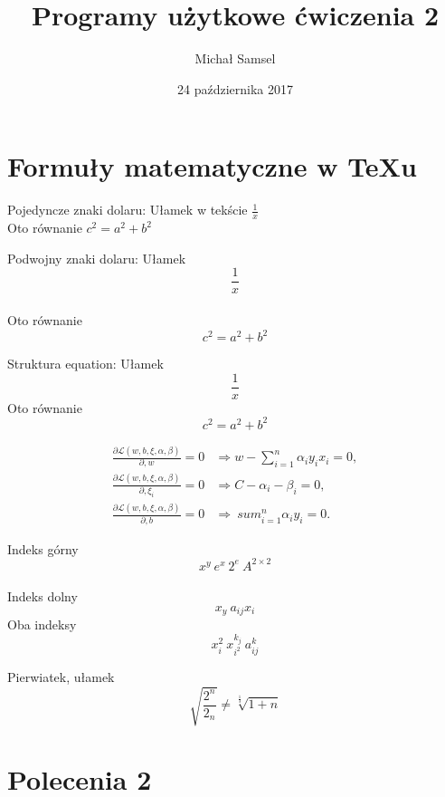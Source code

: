 \documentclass[a4paper,12pt]{article}
\title{Programy użytkowe ćwiczenia 2}
\author{Michał Samsel}
\date{24 października 2017}
\begin{document}
\maketitle

\begin{abstract}

\end{abstract}

\section{Formuły matematyczne w TeXu}
Pojedyncze znaki dolaru:
Ułamek w tekście $ \frac{1}{x} $ \\
Oto równanie $c^{2}=a^{2}+b^{2}$



Podwojny znaki dolaru:
Ułamek $$ \frac{1}{x} $$ \\
Oto równanie $$c^{2}=a^{2}+b^{2}$$



Struktura equation:
Ułamek
\begin{equation}
\frac{1}{x}
\label{eq:rownanie1}
\end{equation}
Oto równanie
\begin{equation}
c^{2}=a^{2}+b^{2}
\label{eq:rownanie2}
\end{equation}



\begin{align}
\label{eq:partialLW}
\frac{\partial \mathcal L (w, b, \xi, \alpha, \beta)}{\partial, w} = 0 & \Rightarrow w 
		- \sum_{i=1}^n\alpha_i y_i x_i=0, \\
\label{eq:PartialLXi}
\frac{\partial \mathcal L (w, b, \xi, \alpha, \beta)}{\partial, \xi_i} =0 & \Rightarrow
		C - \alpha_i-\beta_i=0, \\
\label{eq:partialLB}
\frac{\partial \mathcal L (w, b, \xi, \alpha, \beta)}{\partial, b} = 0 & \Rightarrow \
		sum_{i=1}^n\alpha_i y_i =0.
\end{align}



Indeks górny $$x^{y} \ e^{x} \ 2^{e} \ A^{2 \times 2}$$\\
Indeks dolny $$ x_y \ a_{ij} x_{i}$$
Oba indeksy $$ x_i^2 \ x_{i^2}^{k_j} \ a_{ij}^k $$



Pierwiatek, ułamek
$$ \sqrt{ \frac{2^n}{2_n}} \neq \sqrt[ \frac{1}{3}]{1+n} $$



\section{Polecenia 2}
\end{document}

